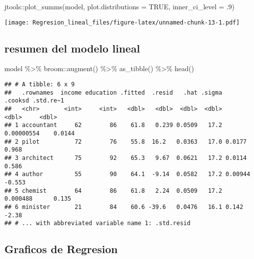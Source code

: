 \documentclass[
]{article}
\newenvironment{Shaded}{\begin{snugshade}}{\end{snugshade}}
\newcommand{\AttributeTok}[1]{\textcolor[rgb]{0.77,0.63,0.00}{#1}}
\newcommand{\ConstantTok}[1]{\textcolor[rgb]{0.00,0.00,0.00}{#1}}
\newcommand{\DecValTok}[1]{\textcolor[rgb]{0.00,0.00,0.81}{#1}}
\newcommand{\FunctionTok}[1]{\textcolor[rgb]{0.00,0.00,0.00}{#1}}
\newcommand{\NormalTok}[1]{#1}
\newcommand{\SpecialCharTok}[1]{\textcolor[rgb]{0.00,0.00,0.00}{#1}}
\begin{document}
\begin{Shaded}
\begin{Highlighting}[]
\NormalTok{jtools}\SpecialCharTok{::}\FunctionTok{plot\_summs}\NormalTok{(model, }\AttributeTok{plot.distributions =} \ConstantTok{TRUE}\NormalTok{, }\AttributeTok{inner\_ci\_level =}\NormalTok{ .}\DecValTok{9}\NormalTok{)}
\end{Highlighting}
\end{Shaded}

\texttt{[image: Regresion\_lineal\_files/figure-latex/unnamed-chunk-13-1.pdf]}

\pagebreak

\hypertarget{resumen-del-modelo-lineal}{%
\subsection{resumen del modelo lineal}\label{resumen-del-modelo-lineal}}

\begin{Shaded}
\begin{Highlighting}[]
\NormalTok{model }\SpecialCharTok{\%\textgreater{}\%}\NormalTok{ broom}\SpecialCharTok{::}\FunctionTok{augment}\NormalTok{() }\SpecialCharTok{\%\textgreater{}\%} \FunctionTok{as\_tibble}\NormalTok{() }\SpecialCharTok{\%\textgreater{}\%} \FunctionTok{head}\NormalTok{()}
\end{Highlighting}
\end{Shaded}

\begin{verbatim}
## # A tibble: 6 x 9
##   .rownames  income education .fitted  .resid   .hat .sigma    .cooksd .std.re~1
##   <chr>       <int>     <int>   <dbl>   <dbl>  <dbl>  <dbl>      <dbl>     <dbl>
## 1 accountant     62        86    61.8   0.239 0.0509   17.2 0.00000554    0.0144
## 2 pilot          72        76    55.8  16.2   0.0363   17.0 0.0177        0.968 
## 3 architect      75        92    65.3   9.67  0.0621   17.2 0.0114        0.586 
## 4 author         55        90    64.1  -9.14  0.0582   17.2 0.00944      -0.553 
## 5 chemist        64        86    61.8   2.24  0.0509   17.2 0.000488      0.135 
## 6 minister       21        84    60.6 -39.6   0.0476   16.1 0.142        -2.38  
## # ... with abbreviated variable name 1: .std.resid
\end{verbatim}

\hypertarget{graficos-de-regresion}{%
\subsection{Graficos de Regresion}\label{graficos-de-regresion}}
\end{document}
